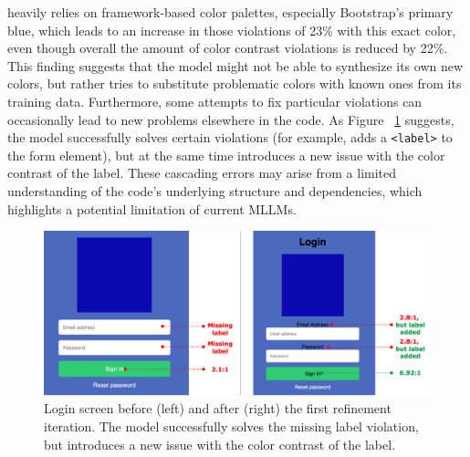heavily relies on framework-based color palettes, 
especially Bootstrap's primary blue, which leads to 
an increase in those violations of 23\% with 
this exact color, even though overall the amount 
of color contrast violations is reduced by 22\%. 
This finding suggests that the model might not be able to 
synthesize its own new colors, but rather tries to
substitute problematic colors with known ones
from its training data.
Furthermore, some
attempts to fix particular violations can 
occasionally lead to new problems elsewhere in 
the code. As Figure ~\ref{fig:iterativecascadingissues} suggests, the model 
successfully solves certain violations (for example, adds 
a \texttt{<label>} to the form element), but at the same time 
introduces a new issue with the color contrast of the label.
These cascading errors may arise from a limited 
understanding of the code's underlying structure and 
dependencies, which highlights a potential limitation 
of current MLLMs.

\begin{figure}
  \centering
  \includegraphics[width=0.9\linewidth]{figures/iterativecascadingissues.png}
  \caption{Login screen before (left) and after (right) the first refinement iteration. The model successfully solves the missing label violation, but introduces a new issue with the color contrast of the label.}
  \label{fig:iterativecascadingissues} 
\end{figure}

